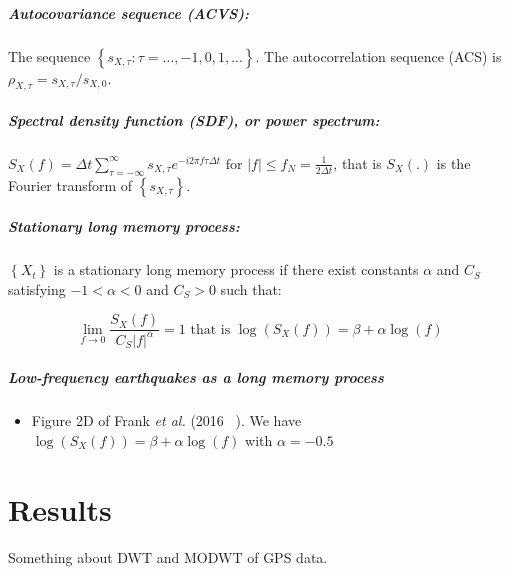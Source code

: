 \documentclass[main.tex]{subfiles}
\begin{document}
\paragraph{Autocovariance sequence (ACVS):} The sequence $\left\{ s_{X , \tau} : \tau = ... , -1 , 0 , 1 , ... \right\}$. The autocorrelation sequence (ACS) is $\rho_{X , \tau} = s_{X , \tau } / s_{X , 0}$.

\paragraph{Spectral density function (SDF), or power spectrum:} $S_X \left( f \right) = \Delta t \sum_{\tau = - \infty}^{\infty} s_{X , \tau} e^{- i 2 \pi f \tau \Delta t} \text{ for } \left| f \right| \leq f_N = \frac{1}{2 \Delta t}$, that is $S_X \left( . \right)$ is the Fourier transform of $\left\{ s_{X , \tau} \right\}$.

\paragraph{Stationary long memory process:} $\left\{ X_t \right\}$ is a stationary long memory process if there exist constants $\alpha$ and $C_S$ satisfying $ -1 < \alpha < 0$ and $C_S > 0$ such that:

\begin{equation}
\lim_{f \to 0} \frac{S_X \left( f \right)}{C_S \left| f \right| ^{\alpha}} = 1 \text{ that is } \log \left( S_X \left( f \right) \right) = \beta + \alpha \log \left( f \right)
\end{equation}

\paragraph{Low-frequency earthquakes as a long memory process}

\begin{itemize}
\item Figure 2D of Frank \textit{et al.} (2016 ~\cite{FRA_2016}). We have $\log \left( S_X \left( f \right) \right) = \beta + \alpha \log \left( f \right)$ with $\alpha = - 0.5$
\end{itemize}

\chapter{Results}

Something about DWT and MODWT of GPS data.
\end{document}
